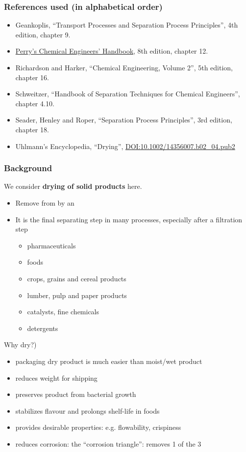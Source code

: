 \begin{frame}\frametitle{References used (in alphabetical order)}
	\begin{itemize}
		\item	Geankoplis, ``Transport Processes and Separation Process Principles'', 4th edition, chapter 9.
		\item	\href{http://accessengineeringlibrary.com/browse/perrys-chemical-engineers-handbook-eighth-edition}{Perry's Chemical Engineers' Handbook}, 8th edition, chapter 12.
		\item	Richardson and Harker, ``Chemical Engineering, Volume 2'', 5th edition, chapter 16.
		\item	Schweitzer, ``Handbook of Separation Techniques for Chemical Engineers'', chapter 4.10.
		\item	Seader, Henley and Roper, ``Separation Process Principles'', 3rd edition, chapter 18.
		\item	Uhlmann's Encyclopedia, ``Drying'', {\tiny \href{http://dx.doi.org/10.1002/14356007.b02\_04.pub2}{DOI:10.1002/14356007.b02\_04.pub2}}
	\end{itemize}
\end{frame}

\begin{frame}\frametitle{Background}
	We consider \textbf{drying of solid products} here.
	\begin{itemize}
		\item	Remove {\color{myOrange}{liquid phase}} from {\color{myOrange}{solid phase}} by an {\color{myOrange}{ESA = thermal energy}}
		\item	It is the final separating step in many processes, especially after a filtration step
		\begin{itemize}
			\item	pharmaceuticals %
			\item	foods %
			\item	crops, grains and cereal products %
			\item	lumber, pulp and paper products %
			\item	catalysts, fine chemicals  %
			\item	detergents
		\end{itemize}
	\end{itemize}
	Why dry?)
	\begin{itemize}
		\item	packaging dry product is much easier than moist/wet product
		\item	reduces weight for shipping
		\item	preserves product from bacterial growth
		\item	stabilizes flavour and prolongs shelf-life in foods
		\item	provides desirable properties: e.g. flowability, crispiness
		\item	reduces corrosion: the ``corrosion triangle'': removes 1 of the 3 %
	\end{itemize}
\end{frame}

